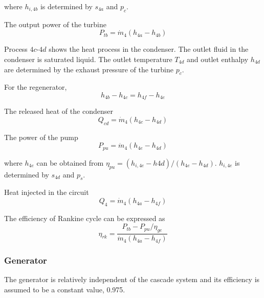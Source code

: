 where $h_{i,4b}$ is determined by $s_{4a}$ and $p_c$.

The output power of the turbine
\begin{equation}
  P_{tb}=\dot{m}_{4}(h_{4a}-h_{4b})
\end{equation}

Process $4c$-$4d$ shows the heat process in the condenser. The outlet fluid in the condenser is saturated liquid. The outlet temperature $T_{4d}$ and outlet enthalpy $h_{4d}$ are determined by the exhaust pressure of the turbine $p_c$.

  For the regenerator,
  \begin{equation}
      h_{4b} - h_{4c} = h_{4f} - h_{4e}
  \end{equation}
  
  The released heat of the condenser
  \begin{equation}
      Q_{cd} = \dot{m}_4 (h_{4c} - h_{4d})
\end{equation}

    The power of the pump
  \begin{equation}
	P_{pu}=\dot{m}_{4}(h_{4e}-h_{4d})
\end{equation}
    
    where $h_{4e}$ can be obtained from $\eta_{pu} = (h_{i,4e}-h{4d})/(h_{4e}-h_{4d})$. $h_{i,4e}$ is determined by $s_{4d}$ and $p_s$.
    
  Heat injected in the circuit
\begin{equation}
	    Q_4=\dot{m}_4(h_{4a}-h_{4f})
    \end{equation}

The efficiency of Rankine cycle can be expressed as
\begin{equation}
	\eta_{rk}=\dfrac{P_{tb}-P_{pu}/\eta_{ge}}{\dot{m}_4(h_{4a}-h_{4f})}
\end{equation}




\subsubsection{Generator}
The generator is relatively independent of the cascade system and its efficiency is assumed to be a constant value, 0.975.


